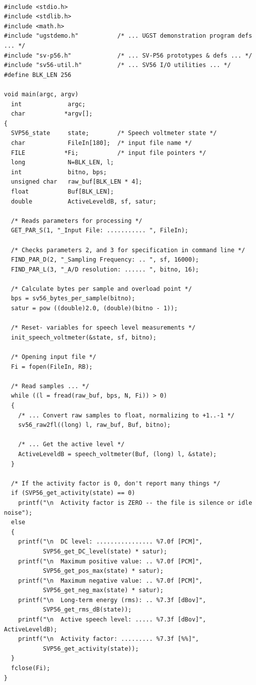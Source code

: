 {\tt\small
\begin{verbatim}
#include <stdio.h>
#include <stdlib.h>
#include <math.h>
#include "ugstdemo.h"           /* ... UGST demonstration program defs ... */
#include "sv-p56.h"             /* ... SV-P56 prototypes & defs ... */
#include "sv56-util.h"          /* ... SV56 I/O utilities ... */
#define BLK_LEN 256

void main(argc, argv)
  int             argc;
  char           *argv[];
{
  SVP56_state     state;        /* Speech voltmeter state */
  char            FileIn[180];  /* input file name */
  FILE           *Fi;           /* input file pointers */
  long            N=BLK_LEN, l;
  int             bitno, bps;
  unsigned char   raw_buf[BLK_LEN * 4];
  float           Buf[BLK_LEN];
  double          ActiveLeveldB, sf, satur;

  /* Reads parameters for processing */
  GET_PAR_S(1, "_Input File: ........... ", FileIn);

  /* Checks parameters 2, and 3 for specification in command line */
  FIND_PAR_D(2, "_Sampling Frequency: .. ", sf, 16000);
  FIND_PAR_L(3, "_A/D resolution: ...... ", bitno, 16);

  /* Calculate bytes per sample and overload point */
  bps = sv56_bytes_per_sample(bitno);
  satur = pow ((double)2.0, (double)(bitno - 1));

  /* Reset- variables for speech level measurements */
  init_speech_voltmeter(&state, sf, bitno);

  /* Opening input file */
  Fi = fopen(FileIn, RB);

  /* Read samples ... */
  while ((l = fread(raw_buf, bps, N, Fi)) > 0)
  {
    /* ... Convert raw samples to float, normalizing to +1..-1 */
    sv56_raw2fl((long) l, raw_buf, Buf, bitno);

    /* ... Get the active level */
    ActiveLeveldB = speech_voltmeter(Buf, (long) l, &state);
  }

  /* If the activity factor is 0, don't report many things */
  if (SVP56_get_activity(state) == 0)
    printf("\n  Activity factor is ZERO -- the file is silence or idle noise");
  else
  {
    printf("\n  DC level: ................ %7.0f [PCM]", 
           SVP56_get_DC_level(state) * satur);
    printf("\n  Maximum positive value: .. %7.0f [PCM]", 
           SVP56_get_pos_max(state) * satur);
    printf("\n  Maximum negative value: .. %7.0f [PCM]", 
           SVP56_get_neg_max(state) * satur);
    printf("\n  Long-term energy (rms): .. %7.3f [dBov]", 
           SVP56_get_rms_dB(state));
    printf("\n  Active speech level: ..... %7.3f [dBov]", ActiveLeveldB);
    printf("\n  Activity factor: ......... %7.3f [%%]",
           SVP56_get_activity(state));
  }
  fclose(Fi);
}
\end{verbatim}
}
